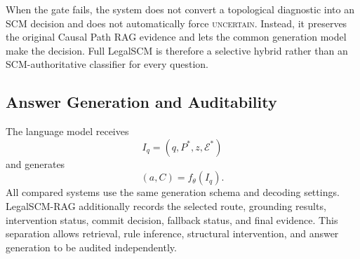 When the gate fails, the system does not convert a topological diagnostic into
an SCM decision and does not automatically force \textsc{uncertain}. Instead,
it preserves the original Causal Path RAG evidence and lets the common
generation model make the decision. Full LegalSCM is therefore a selective
hybrid rather than an SCM-authoritative classifier for every question.

\subsection{Answer Generation and Auditability}

The language model receives
\begin{equation}
I_q=(q,P^*,z,\mathcal{E}^*)
\end{equation}
and generates
\begin{equation}
(a,C)=f_{\theta}(I_q).
\end{equation}
All compared systems use the same generation schema and decoding settings.
LegalSCM-RAG additionally records the selected route, grounding results,
intervention status, commit decision, fallback status, and final evidence.
This separation allows retrieval, rule inference, structural intervention, and
answer generation to be audited independently.
